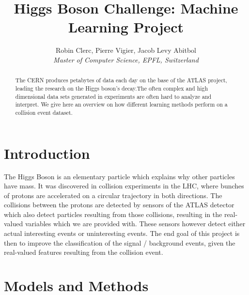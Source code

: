 \documentclass[10pt,conference,compsocconf]{IEEEtran}
\begin{document}
\title{Higgs Boson Challenge: Machine Learning Project}

\author{
  Robin Clerc, Pierre Vigier, Jacob Levy Abitbol\\
  \textit{Master of Computer Science, EPFL, Switzerland}
}

\maketitle

\begin{abstract}
  The CERN produces petabytes of data each day on the base of the ATLAS project, leading the research on the Higgs boson's decay.The often complex and high dimensional data sets generated in experiments are often hard to analyze and interpret. We give here an overview on how different learning methods perform on a collision event dataset.
  \end{abstract}

\section{Introduction}

The Higgs Boson is an elementary particle which explains why other particles have mass. It was discovered in collision experiments in the LHC, where  bunches of protons are accelerated on a circular trajectory in both directions. The collisions between the protons are detected by sensors of the ATLAS detector which also detect particles resulting from those collisions, resulting in the real-valued variables which we are provided with. These sensors however detect either actual interesting events or uninteresting events. The end goal of this project is then to improve the classification of the signal / background events, given the real-valued features resulting from the collision event.

\section{Models and Methods}
\label{sec:structure-paper}
\end{document}
